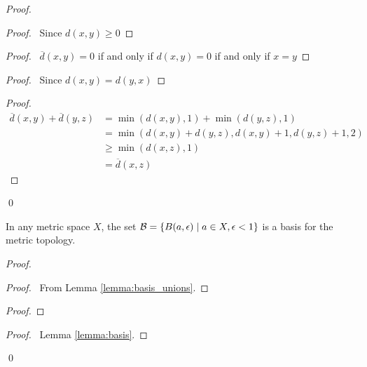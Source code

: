 \begin{proof}
    \pf
    \begin{proof}
        \pf\ Since $d(x,y) \geq 0$
    \end{proof}
    \begin{proof}
        \pf\ $\overline{d}(x,y) = 0$ if and only if $d(x,y) = 0$ if and only if $x = y$
    \end{proof}
    \begin{proof}
        \pf\ Since $d(x,y) = d(y,x)$
    \end{proof}
    \begin{proof}
        \pf
        \begin{align*}
            \overline{d}(x,y) + \overline{d}(y,z) & = \min(d(x,y),1) + \min(d(y,z),1) \\
            & = \min(d(x,y) + d(y,z), d(x,y) + 1, d(y,z) + 1, 2) \\
            & \geq \min(d(x,z), 1) \\
            & = \overline{d}(x,z)
        \end{align*}
    \end{proof}
    \qed
\end{proof}

\begin{lemma}
    \label{lemma:basis_radius_less_than_one}
    In any metric space $X$, the set $\mathcal{B} = \{ B(a, \epsilon) \mid a \in X, \epsilon < 1 \}$ is a basis for the metric topology.
\end{lemma}

\begin{proof}
    \pf
    \begin{proof}
        \pf\ From Lemma \ref{lemma:basis_unions}.
    \end{proof}
    \begin{proof}
    \end{proof}
    \qedstep
    \begin{proof}
        \pf\ Lemma \ref{lemma:basis}.
    \end{proof}
    \qed
\end{proof}

